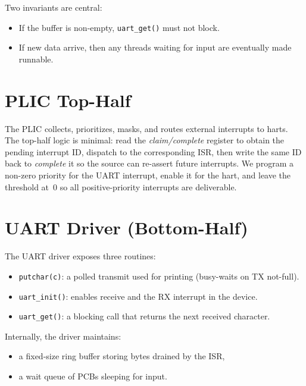 Two invariants are central:
\begin{itemize}
  \item If the buffer is non-empty, \texttt{uart\_get()} must not block.
  \item If new data arrive, then any threads waiting for input are eventually made runnable.
\end{itemize}

\section{PLIC Top-Half}
\label{sec:plic}

The PLIC collects, prioritizes, masks, and routes external interrupts to harts. The top-half logic
is minimal: read the \emph{claim/complete} register to obtain the pending interrupt ID, dispatch to
the corresponding ISR, then write the same ID back to \emph{complete} it so the source can re-assert
future interrupts. We program a non-zero priority for the UART interrupt, enable it for the hart,
and leave the threshold at~0 so all positive-priority interrupts are deliverable.





\section{UART Driver (Bottom-Half)}
\label{sec:uart}

The UART driver exposes three routines:
\begin{itemize}
  \item \texttt{putchar(c)}: a polled transmit used for printing (busy-waits on TX not-full).
  \item \texttt{uart\_init()}: enables receive and the RX interrupt in the device.
  \item \texttt{uart\_get()}: a blocking call that returns the next received character.
\end{itemize}

Internally, the driver maintains:
\begin{itemize}
  \item a fixed-size ring buffer storing bytes drained by the ISR,
  \item a wait queue of PCBs sleeping for input.
\end{itemize}

